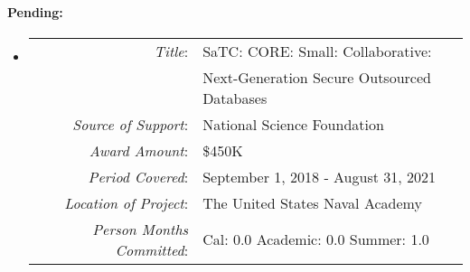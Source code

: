\documentclass[10pt]{article}
\begin{document}
\paragraph{\bf Pending:}

\begin{itemize}
\item[]
  \begin{tabular} {r l}
    {\em Title}: & SaTC: CORE: Small: Collaborative: \\
     &  Next-Generation Secure Outsourced Databases \\
    {\em Source of Support}: & National Science Foundation \\
    {\em Award Amount}: & \$450K\\
    {\em Period Covered}: & September 1, 2018 - August 31, 2021\\
    {\em Location of Project}: & The United States Naval Academy \\
    {\em Person Months Committed}: & Cal: 0.0 Academic: 0.0 Summer: 1.0\\
 \end{tabular}

  

 


\end{itemize}
\end{document}

